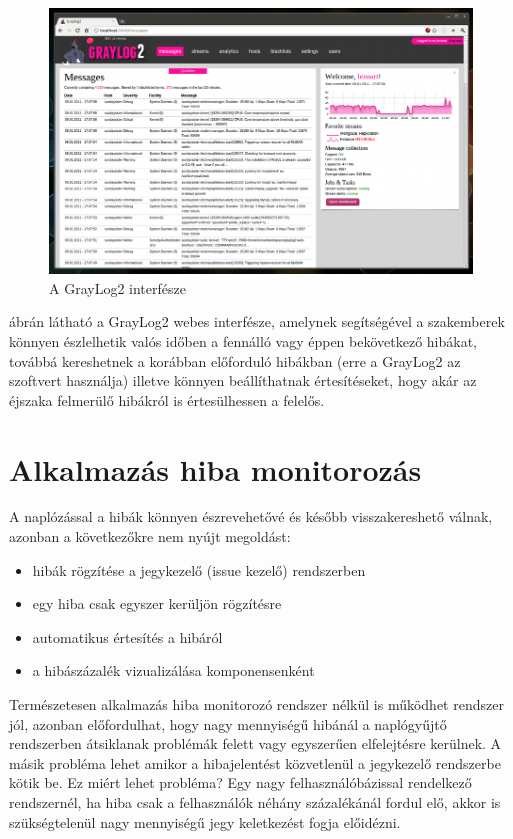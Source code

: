 \begin{figure}[ht]
	\centering
		\includegraphics[scale=0.5]{assets/graylog2.png}%
		\caption[DUMMY]%
		{A GrayLog2 interfésze}%
		\label{fig:graylog2-webinterface}
\end{figure}

 ábrán látható a GrayLog2 webes interfésze, amelynek segítségével a szakemberek könnyen észlelhetik valós időben a fennálló vagy éppen bekövetkező hibákat, továbbá kereshetnek a korábban előforduló hibákban (erre a GrayLog2 az   szoftvert használja) illetve könnyen beállíthatnak értesítéseket, hogy akár az éjszaka felmerülő hibákról is értesülhessen a felelős.

\section{Alkalmazás hiba monitorozás\\}
A naplózással a hibák könnyen észrevehetővé és később visszakereshető válnak, azonban a következőkre nem nyújt megoldást:\\
\begin{itemize}
\item hibák rögzítése a jegykezelő (issue kezelő) rendszerben
\item egy hiba csak egyszer kerüljön rögzítésre
\item automatikus értesítés a hibáról
\item a hibászázalék vizualizálása komponensenként
\end{itemize}

Természetesen alkalmazás hiba monitorozó rendszer nélkül is működhet rendszer jól, azonban előfordulhat, hogy nagy mennyiségű hibánál a naplógyűjtő rendszerben átsiklanak problémák felett vagy egyszerűen elfelejtésre kerülnek. A másik probléma lehet amikor a hibajelentést közvetlenül a jegykezelő rendszerbe kötik be. Ez miért lehet probléma? Egy nagy felhasználóbázissal rendelkező rendszernél, ha hiba csak a felhasználók néhány százalékánál fordul elő, akkor is szükségtelenül nagy mennyiségű jegy keletkezést fogja előidézni.\\

